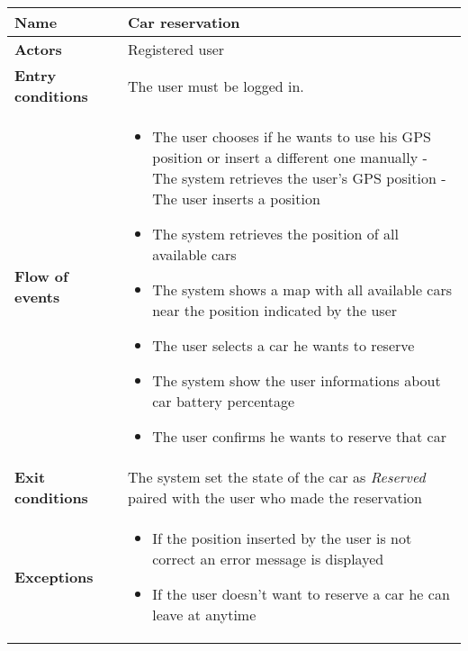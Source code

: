 \begin{tabular}{p{0.25\linewidth}p{0.75\linewidth}}
\toprule
\textbf{Name} & Car reservation \\
\midrule
\textbf{Actors} &  Registered user \\
\midrule
\textbf{Entry conditions} & The user must be logged in. \\
\midrule
\textbf{Flow of events} & 
\begin{itemize}
	\item The user chooses if he wants to use his GPS position or insert a different one manually
		\subitem - The system retrieves the user's  GPS position
		\subitem - The user inserts a position
	\item The system retrieves the position of all available cars
	\item The system shows a map with all available cars near the position indicated by the user
	\item The user selects a car he wants to reserve
	\item The system show the user informations about car battery percentage
	\item The user confirms he wants to reserve that car
\end{itemize} \\
\midrule
\textbf{Exit conditions} & The system set the state of the car as \emph{Reserved} paired with the user who made the reservation\\
\midrule
\textbf{Exceptions} & 
\begin{itemize}
	\item If the position inserted by the user is not correct an error message is displayed
	\item If the user doesn't want to reserve a car he can leave at anytime
\end{itemize} \\
\bottomrule
\end{tabular}